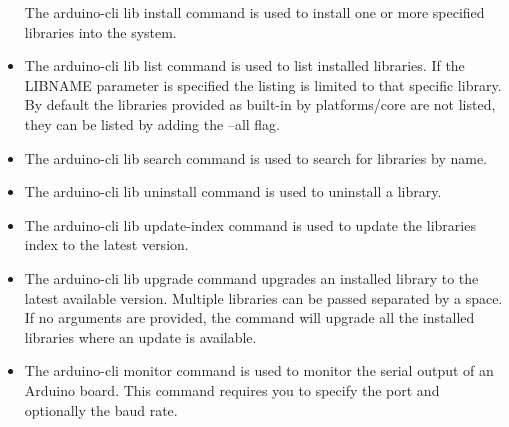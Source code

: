 \begin{itemize}
    The arduino-cli lib install command is used to install one or more specified libraries into the system.
    
    
    \item {}
    
    The arduino-cli lib list command is used to list installed libraries.
    If the LIBNAME parameter is specified the listing is limited to that specific library. By default the libraries provided as built-in by platforms/core are not listed, they can be listed by adding the --all flag.
    
    
    \item {}
    
    The arduino-cli lib search command is used to search for libraries by name.
    
    
    \item {}
    
    The arduino-cli lib uninstall command is used to uninstall a library.
    
    
    \item {}
    
    The arduino-cli lib update-index command is used to update the libraries index to the latest version.
    
    
    \item {}
    
    The arduino-cli lib upgrade command upgrades an installed library to the latest available version. Multiple libraries can be passed separated by a space. If no arguments are provided, the command will upgrade all the installed libraries where an update is available.
    
    
    \item {}
    
    The arduino-cli monitor command is used to monitor the serial output of an Arduino board. This command requires you to specify the port and optionally the baud rate.
    

\end{itemize}
